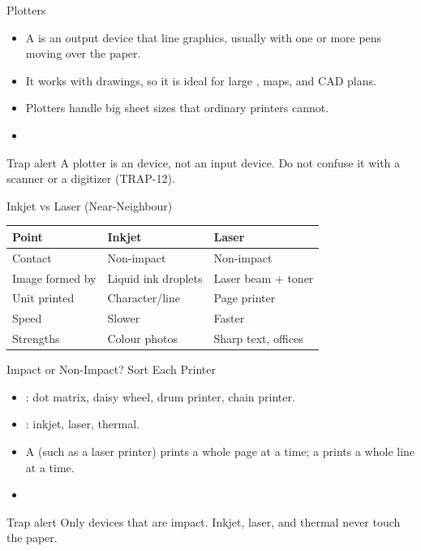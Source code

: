 \documentclass[aspectratio=169]{beamer}
\begin{document}
\begin{frame}{Plotters}
  \begin{itemize}
    \item A  is an output device that  line
      graphics, usually with one or more pens moving over the paper.
    \item It works with  drawings, so it is ideal for large
      , maps, and CAD plans.
    \item Plotters handle big sheet sizes that ordinary printers cannot.
    \item {}
  \end{itemize}
  \begin{alertblock}{Trap alert}
    A plotter is an  device, not an input device. Do not confuse
    it with a scanner or a digitizer (TRAP-12).
  \end{alertblock}
\end{frame}

\begin{frame}{Inkjet vs Laser (Near-Neighbour)}
  \begin{center}
    \begin{tabular}{lll}
      \toprule
      \textbf{Point} & \textbf{Inkjet} & \textbf{Laser} \\
      \midrule
      Contact & Non-impact & Non-impact \\
      Image formed by & Liquid ink droplets & Laser beam + toner \\
      Unit printed & Character/line & Page printer \\
      Speed & Slower & Faster \\
      Strengths & Colour photos & Sharp text, offices \\
      \bottomrule
    \end{tabular}
  \end{center}
  \vspace{0.25cm}
\end{frame}

\begin{frame}{Impact or Non-Impact? Sort Each Printer}
  \begin{itemize}
    \item {}: dot matrix, daisy wheel, drum printer, chain printer.
    \item {}: inkjet, laser, thermal.
    \item A  (such as a laser printer) prints a whole page
      at a time; a  prints a whole line at a time.
    \item {}
  \end{itemize}
  \begin{alertblock}{Trap alert}
    Only devices that  are impact. Inkjet,
    laser, and thermal never touch the paper.
  \end{alertblock}
\end{frame}
\end{document}
